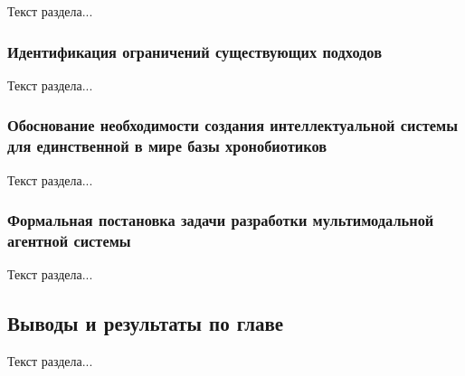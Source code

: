 Текст раздела...

\subsubsection{Идентификация ограничений существующих подходов}

Текст раздела...

\subsubsection{Обоснование необходимости создания интеллектуальной системы для единственной в мире базы хронобиотиков}

Текст раздела...

\subsubsection{Формальная постановка задачи разработки мультимодальной агентной системы}

Текст раздела...

\subsection{Выводы и результаты по главе}

Текст раздела...